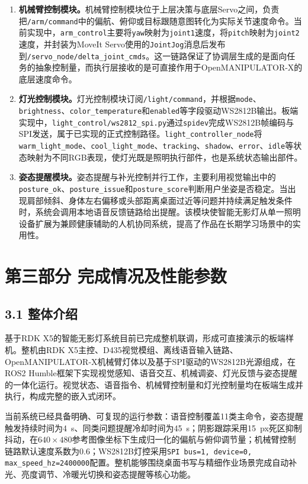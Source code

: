 \documentclass[UTF8,a4paper,zihao=-4]{ctexart}
\begin{document}
\begin{enumerate}[label=\arabic*.]
  \item \textbf{机械臂控制模块。}机械臂控制模块位于上层决策与底层Servo之间，负责把\texttt{/arm/command}中的偏航、俯仰或目标跟随意图转化为实际关节速度命令。当前实现中，\texttt{arm\_control}主要将\texttt{yaw}映射为\texttt{joint1}速度，将\texttt{pitch}映射为\texttt{joint2}速度，并封装为MoveIt Servo使用的\texttt{JointJog}消息后发布到\texttt{/servo\_node/delta\_joint\_cmds}。这一链路保证了协调层生成的是面向任务的抽象控制量，而执行层接收的是可直接作用于OpenMANIPULATOR-X的底层速度命令。

  \item \textbf{灯光控制模块。}灯光控制模块订阅\texttt{/light/command}，并根据\texttt{mode}、\texttt{brightness}、\texttt{color\_temperature}和\texttt{enabled}等字段驱动WS2812B输出。板端实现中，\texttt{light\_control/ws2812\_spi.py}通过\texttt{spidev}完成WS2812B帧编码与SPI发送，属于已实现的正式控制路径。\texttt{light\_controller\_node}将\texttt{warm\_light\_mode}、\texttt{cool\_light\_mode}、\texttt{tracking}、\texttt{shadow}、\texttt{error}、\texttt{idle}等状态映射为不同RGB表现，使灯光既是照明执行部件，也是系统状态输出部件。

  \item \textbf{姿态提醒模块。}姿态提醒与补光控制并行工作，主要利用视觉输出中的\texttt{posture\_ok}、\texttt{posture\_issue}和\texttt{posture\_score}判断用户坐姿是否稳定。当出现肩部倾斜、身体左右偏移或头部距离桌面过近等问题并持续满足触发条件时，系统会调用本地语音反馈链路给出提醒。该模块使智能无影灯从单一照明设备扩展为兼顾健康辅助的人机协同系统，提高了作品在长期学习场景中的实用性。
\end{enumerate}

\section*{第三部分 完成情况及性能参数}

\subsection*{3.1 整体介绍}

基于RDK X5的智能无影灯系统目前已完成整机联调，形成可直接演示的板端样机。整机由RDK X5主控、D435视觉模组、离线语音输入链路、OpenMANIPULATOR-X机械臂灯体以及基于SPI驱动的WS2812B光源组成，在ROS2 Humble框架下实现视觉感知、语音交互、机械调姿、灯光反馈与姿态提醒的一体化运行。视觉状态、语音指令、机械臂控制量和灯光控制量均在板端生成并执行，构成完整的嵌入式闭环。

当前系统已经具备明确、可复现的运行参数：语音控制覆盖11类主命令，姿态提醒触发持续时间为4~s、同类问题提醒冷却时间为45~s；阴影跟踪采用15~px死区抑制抖动，在$640\times480$参考图像坐标下生成归一化的偏航与俯仰调节量；机械臂控制链路默认速度系数为0.6；WS2812B灯控采用\texttt{SPI bus=1, device=0, max\_speed\_hz=2400000}配置。整机能够围绕桌面书写与精细作业场景完成自动补光、亮度调节、冷暖光切换和姿态提醒等核心功能。
\end{document}
